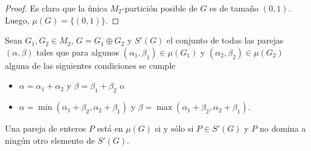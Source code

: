 \begin{proof}
Es claro que la única $M_2$-partición posible de $G$ es de tamaño $(0,1)$. Luego, $\mu(G)=\{(0,1)\}$.
\end{proof}

\begin{lemma}\label{lema_parejas_07}
Sean $G_1, G_2 \in M_2$, $G=G_1 \oplus G_2$ y $S'(G)$ el conjunto de todas
las parejas $(\alpha, \beta)$ tales que para algunos $(\alpha_1,\beta_1)
\in \mu(G_1)$ y $(\alpha_2, \beta_2) \in \mu(G_2)$ alguna de las siguientes
condiciones se cumple
\begin{itemize}
    \item $\alpha = \alpha_1+\alpha_2$ y $\beta = \beta_1 + \beta_2$ o
    \item $\alpha = \min (\alpha_1+\beta_2, \alpha_2+\beta_1)$ y $\beta = \max (\alpha_1+\beta_2, \alpha_2+\beta_1)$.
\end{itemize}
Una pareja de enteros $P$ está en $\mu(G)$ si y sólo si $P\in S'(G)$ y $P$ no domina a ningún otro elemento de $S'(G)$.
\end{lemma}

